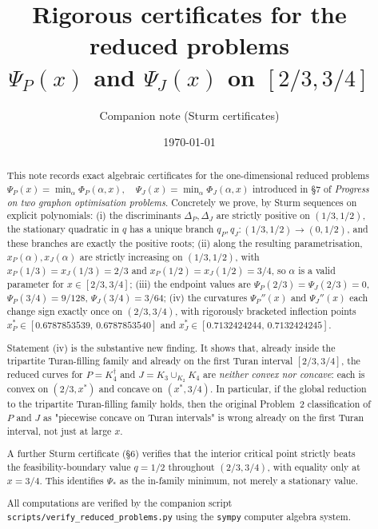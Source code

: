 \documentclass[11pt]{amsart}
\title[Rigorous certificates for the reduced $P$ and $J$ problems]%
{Rigorous certificates for the reduced problems\\
$\Psi_P(x)$ and $\Psi_J(x)$ on $[2/3,3/4]$}
\author{Companion note (Sturm certificates)}
\date{\today}
\theoremstyle{definition}
\begin{document}
\maketitle

\begin{abstract}
This note records exact algebraic certificates for the one-dimensional reduced
problems
\(
   \Psi_P(x) = \min_\alpha \Phi_P(\alpha, x),\quad
   \Psi_J(x) = \min_\alpha \Phi_J(\alpha, x)
\)
introduced in §7 of \emph{Progress on two graphon optimisation problems}.
Concretely we prove, by Sturm sequences on explicit polynomials:
(i) the discriminants $\Delta_P, \Delta_J$ are strictly positive on
$(1/3,1/2)$, the stationary quadratic in $q$ has a unique branch
$q_P,q_J\colon(1/3,1/2)\to(0,1/2)$, and these branches are exactly the
positive roots;
(ii) along the resulting parametrisation, $x_P(\alpha),x_J(\alpha)$ are
strictly increasing on $(1/3,1/2)$, with $x_P(1/3)=x_J(1/3)=2/3$ and
$x_P(1/2)=x_J(1/2)=3/4$, so $\alpha$ is a valid parameter for $x\in[2/3,3/4]$;
(iii) the endpoint values are
$\Psi_P(2/3)=\Psi_J(2/3)=0$, $\Psi_P(3/4)=9/128$, $\Psi_J(3/4)=3/64$;
(iv) the curvatures $\Psi_P''(x)$ and $\Psi_J''(x)$ each change sign exactly
once on $(2/3,3/4)$, with rigorously bracketed inflection points
$x^*_P\in[0.6787853539,\,0.6787853540]$ and
$x^*_J\in[0.7132424244,\,0.7132424245]$.

Statement (iv) is the substantive new finding.  It shows that, already inside
the tripartite Turan-filling family and already on the first Turan interval
$[2/3,3/4]$, the reduced curves for $P=K_4^{\dagger}$ and
$J=K_3\cup_{K_2}K_4$ are \emph{neither convex nor concave}: each is convex
on $(2/3,x^*)$ and concave on $(x^*,3/4)$.  In particular, if the global
reduction to the tripartite Turan-filling family holds, then the original
Problem~2 classification of $P$ and $J$ as "piecewise concave on Turan
intervals" is wrong already on the first Turan interval, not just at large $x$.

A further Sturm certificate (§6) verifies that the interior critical point
strictly beats the feasibility-boundary value $q=1/2$ throughout
$(2/3,3/4)$, with equality only at $x=3/4$.  This identifies $\Psi_*$ as
the in-family minimum, not merely a stationary value.

All computations are verified by the companion script
\verb|scripts/verify_reduced_problems.py| using the
\verb|sympy| computer algebra system.
\end{abstract}

\tableofcontents
\end{document}
